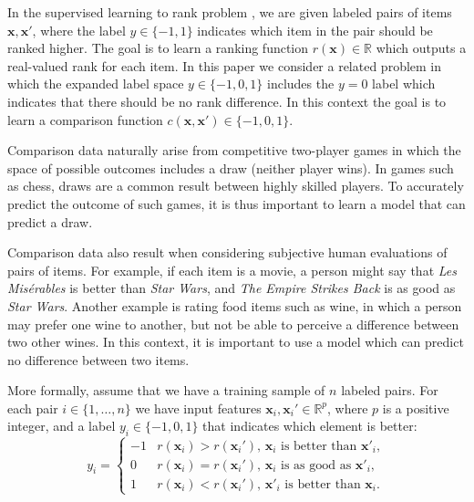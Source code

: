 \documentclass[twoside,11pt]{article}
\newcommand{\RR}{\mathbb R}
\begin{document}
In the supervised learning to rank problem \citep{learning-to-rank}, we are
given labeled pairs of items $\mathbf x,\mathbf x'$, where the label
$y\in\{-1,1\}$ indicates which item in the pair should be ranked
higher. The goal is to learn a ranking function $r(\mathbf x)\in\RR$
which outputs a real-valued rank for each item. In this paper we
consider a related problem in which the expanded label space
$y\in\{-1,0,1\}$ includes the $y=0$ label which indicates that there
should be no rank difference. In this context the goal is to learn a
comparison function $c(\mathbf x, \mathbf x')\in\{-1,0,1\}$.

Comparison data naturally arise from competitive two-player games in which
the space of possible outcomes includes a draw (neither player wins).
In games such as chess, draws are a common result between highly
skilled players. To accurately predict the outcome of such games, it
is thus important to learn a model that can predict a draw. 

Comparison data also result when considering subjective human
evaluations of pairs of items. For example, if each item is a movie, a
person might say that \textit{Les Mis\'erables} is better than
\textit{Star Wars}, and \textit{The Empire Strikes Back} is as good as
\textit{Star Wars}. Another example is rating food items such as
wine, in which a person may prefer one wine to another, but not be
able to perceive a difference between two other wines. In this
context, it is important to use a model which can predict no
difference between two items.

More formally, assume
that we have a training sample of $n$ labeled pairs. For each pair
$i\in\{1,\dots,n\}$ we have input features $\mathbf x_i,\mathbf
x_i'\in\RR^p$, where $p$ is a positive integer, and a label $y_i\in\{-1,0,1\}$ that indicates which
element is better:
\begin{equation}
  \label{eq:z}
  y_i =
  \begin{cases}
    -1 &  r(\mathbf x_i)>r(\mathbf x_i')
    \text{, $\mathbf x_i$ is better than $\mathbf x'_i$},\\
    0 & r(\mathbf x_i) = r(\mathbf x_i')
    \text{, $\mathbf x_i$ is as good as $\mathbf x'_i$},\\
    1 & r(\mathbf x_i)<r(\mathbf x_i')
    \text{, $\mathbf x'_i$ is better than $\mathbf x_i$}.
  \end{cases}
\end{equation}
\end{document}
